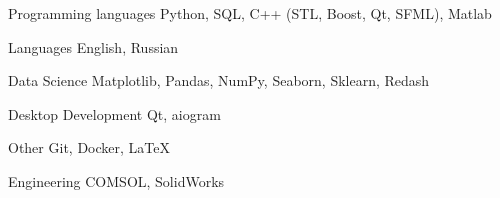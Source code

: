 
\begin{cvskills}

  \cvskill
  {Programming languages}
  {Python, SQL, C++ (STL, Boost, Qt, SFML), Matlab}

  \cvskill
  {Languages}
  {English, Russian}

  \cvskill
  {Data Science}
  {Matplotlib, Pandas, NumPy, Seaborn, Sklearn, Redash}

  \cvskill
  {Desktop Development}
  {Qt, aiogram}

  \cvskill
  {Other}
  {Git, Docker, {\selectfont \LaTeX}}

  \cvskill
  {Engineering}
  {COMSOL, SolidWorks}

\end{cvskills}
